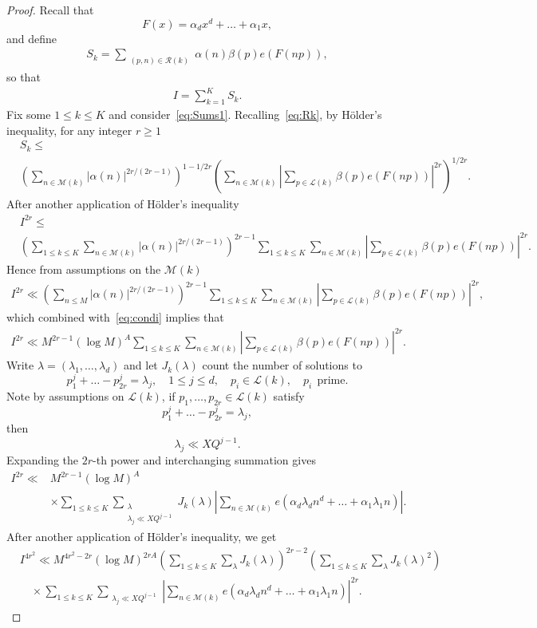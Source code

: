 \documentclass[10pt,a4paper]{amsart}
\def\cL{{\mathcal L}}
\def\cM{{\mathcal M}}
\def\cR{{\mathcal R}}
\def\ge{\geqslant}
\def\le{\leqslant}
\begin{document}
\begin{proof}

Recall that
$$F(x)=\alpha_d x^d+\dots+\alpha_1 x,$$
and define
\begin{align}
\label{eq:Sums1}
S_k=\sum_{\substack{(p,n)\in \cR(k)}}\alpha(n)\beta(p)e(F(np)),
\end{align}
so that 
\begin{align}
\label{eq:IS}
I=\sum_{k=1}^{K}S_k.
\end{align}
Fix some $1\le k \le K$ and consider~\eqref{eq:Sums1}. Recalling~\eqref{eq:Rk}, by H\"{o}lder's inequality, for any integer $r\ge 1$
\begin{align*}
&S_{k}\le \\ & \left(\sum_{n\in \cM(k)}|\alpha(n)|^{2r/(2r-1)}\right)^{1-1/2r}\left(\sum_{n\in \cM(k)}\left|\sum_{p\in \cL(k)}\beta(p)e(F(np))\right|^{2r}\right)^{1/2r}.
\end{align*}
After another application of H\"{o}lder's inequality 
\begin{align*}
&I^{2r}\le \\
&\left(\sum_{1\le k \le K}\sum_{n\in \cM(k)}|\alpha(n)|^{2r/(2r-1)} \right)^{2r-1}\sum_{1\le k \le K}\sum_{n\in \cM(k)}\left|\sum_{p\in \cL(k)}\beta(p)e(F(np))\right|^{2r}.
\end{align*}
Hence from assumptions on the $\cM(k)$
\begin{align*}
I^{2r}\ll \left( \sum_{n \le M} |\alpha (n)|^{2r/(2r-1)} \right)^{2r-1}\sum_{1\le k \le K}\sum_{n\in \cM(k)}\left|\sum_{p\in \cL(k)}\beta(p)e(F(np))\right|^{2r},
\end{align*}
which combined with~\eqref{eq:condi} implies that 
\begin{align*}
I^{2r}\ll  M^{2r-1}(\log{M})^{A } \sum_{1\le k \le K}\sum_{n\in \cM(k)}\left|\sum_{p\in \cL(k)}\beta(p)e(F(np))\right|^{2r}.
\end{align*}
Write $\lambda=(\lambda_1,\dots,\lambda_d)$ and let $J_k(\lambda)$ count the number of solutions to 
$$p_1^{j}+\dots-p_{2r}^j=\lambda_j, \quad 1\le j \le d, \quad p_i\in \cL(k), \quad p_i \ \ \text{prime}.$$
Note by assumptions on $\cL(k)$, if $p_1,\dots,p_{2r}\in \cL(k)$ satisfy 
$$p_1^{j}+\dots-p_{2r}^j=\lambda_j,$$
then 
$$\lambda_j\ll XQ^{j-1}.$$
Expanding the $2r$-th power and interchanging summation gives
\begin{align*}
I^{2r}\ll& M^{2r-1}(\log{M})^{A}\\ & \times \sum_{1\le k \le K}\sum_{\substack{\lambda \\ \lambda_j \ll XQ^{j-1}}} J_k(\lambda)\left|\sum_{n\in \cM(k)}e(\alpha_d\lambda_d n^{d}+\dots+\alpha_1\lambda_1 n)\right|.
\end{align*}
After another application of H\"{o}lder's inequality, we get  
\begin{align*}
& I^{4r^2}\ll M^{4r^2-2r}(\log{M})^{2rA}\left(\sum_{1\le k \le K}\sum_{\lambda} J_k(\lambda)\right)^{2r-2}\left(\sum_{1\le k \le K}\sum_{\lambda} J_k(\lambda)^2\right) \\ 
& \quad \times \sum_{1\le k \le K}\sum_{\substack{ \lambda_j \ll XQ^{j-1}}}\left|\sum_{n\in \cM(k)}e(\alpha_d\lambda_d n^{d}+\dots+\alpha_1\lambda_1 n)\right|^{2r}.
\end{align*}


\end{proof}
\end{document}
